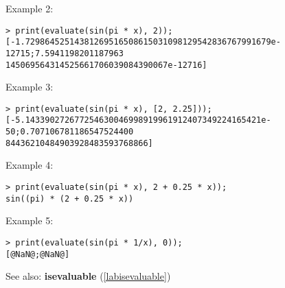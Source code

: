 \noindent Example 2: 
\begin{center}\begin{minipage}{15cm}\begin{Verbatim}[frame=single]
> print(evaluate(sin(pi * x), 2));
[-1.72986452514381269516508615031098129542836767991679e-12715;7.5941198201187963
145069564314525661706039084390067e-12716]
\end{Verbatim}
\end{minipage}\end{center}
\noindent Example 3: 
\begin{center}\begin{minipage}{15cm}\begin{Verbatim}[frame=single]
> print(evaluate(sin(pi * x), [2, 2.25]));
[-5.143390272677254630046998919961912407349224165421e-50;0.707106781186547524400
84436210484903928483593768866]
\end{Verbatim}
\end{minipage}\end{center}
\noindent Example 4: 
\begin{center}\begin{minipage}{15cm}\begin{Verbatim}[frame=single]
> print(evaluate(sin(pi * x), 2 + 0.25 * x));
sin((pi) * (2 + 0.25 * x))
\end{Verbatim}
\end{minipage}\end{center}
\noindent Example 5: 
\begin{center}\begin{minipage}{15cm}\begin{Verbatim}[frame=single]
> print(evaluate(sin(pi * 1/x), 0));
[@NaN@;@NaN@]
\end{Verbatim}
\end{minipage}\end{center}
See also: \textbf{isevaluable} (\ref{labisevaluable})

